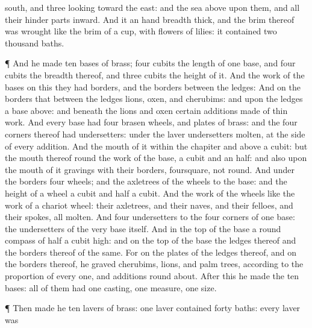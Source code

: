 {south, and
three
looking toward the
east: and the
sea
{}
above upon them, and all their hinder
parts
{}
inward.
And it
{} an hand
breadth
thick, and the
brim thereof was
wrought like the
brim of a
cup, with
flowers of
lilies: it
contained two
thousand
baths.
\par }{\PP {}¶ And he
made
ten
bases of
brass;
four
cubits
{} the
length of
one
base, and
four
cubits the
breadth thereof, and
three
cubits the
height of it.
And the
work of the
bases
{} on this
{} they had
borders, and the
borders
{} between the
ledges:
And on the
borders that
{} between the
ledges
{}
lions,
oxen, and
cherubims: and upon the
ledges
{} a
base
above: and beneath the
lions and
oxen
{} certain
additions made of
thin
work.
And
every
base had
four
brasen
wheels, and
plates of
brass: and the
four
corners thereof had
undersetters: under the
laver
{}
undersetters
molten, at the
side of
every
addition.
And the
mouth of it
within the
chapiter and
above
{} a
cubit: but the
mouth thereof
{}
round
{} the
work of the
base, a
cubit and an
half: and also upon the
mouth of it
{}
gravings with their
borders,
foursquare, not
round.
And
under the
borders
{}
four
wheels; and the
axletrees of the
wheels
{} to the
base: and the
height of
a
wheel
{} a
cubit and
half a
cubit.
And the
work of the
wheels
{} like the
work of a
chariot
wheel: their
axletrees, and their
naves, and their
felloes, and their
spokes,
{} all
molten.
And
{}
four
undersetters to the
four
corners of
one
base:
{} the
undersetters
{} of the very
base itself.
And in the
top of the
base
{} a
round
compass of
half a
cubit
high: and on the
top of the
base the
ledges thereof and the
borders thereof
{} of the same.
For on the
plates of the
ledges thereof, and on the
borders thereof, he
graved
cherubims,
lions, and palm
trees, according to the
proportion of every
one, and
additions round
about.
After this
{} he
made the
ten
bases: all of them had
one
casting,
one
measure,
{}
one
size.
\par }{\PP {}¶ Then
made he
ten
lavers of
brass:
one
laver
contained
forty
baths:
{}
every
laver was
}
